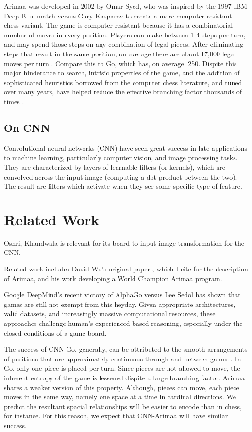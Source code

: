 \documentclass{article}
\begin{document}
Arimaa was developed in 2002 by Omar Syed, who was inspired by the 1997 IBM Deep Blue match versus Gary Kasparov to create a more computer-resistant chess variant.  The game is computer-resistant because it has a combinatorial number of moves in every position.  Players can make between 1-4 steps per turn, and may spend those steps on any combination of legal pieces.  After eliminating steps that result in the same position, on average there are about 17,000 legal moves per turn \cite{haskin}.  Compare this to Go, which has, on average, 250.  Dispite this major hinderance to search, intrisic properties of the game, and the addition of sophisticated heuristics borrowed from the computer chess literature, and tuned over many years, have helped reduce the effective branching factor thousands of times \cite{wu}.

\subsection{On CNN}

Convolutional neural networks (CNN) have seen great success in late applications to machine learning, particularly computer vision, and image processing tasks.  They are characterized by layers of learnable filters (or kernels), which are convolved across the input image (computing a dot product between the two).  The result are filters which activate when they see some specific type of feature.  

\section{Related Work}

Oshri, Khandwala \cite{Oshri_Khandwala} is relevant for its board to input image transformation for the CNN.

Related work includes David Wu's original paper \cite{wu}, which I cite for the description of Arimaa, and his work developing a World Champion Arimaa program.

Google DeepMind's recent victory of AlphaGo versus Lee Sedol has shown that games are still not exempt from this heyday.  Given appropriate architectures, valid datasets, and increasingly massive computational resources, these approaches challenge human's experienced-based reasoning, especially under the closed conditions of a game board.

The success of CNN-Go, generally, can be attributed to the smooth arrangements of positions that are approximately continuous through and between games \cite{Oshri_Khandwala}.  In Go, only one piece is placed per turn.  Since pieces are not allowed to move, the inherent entropy of the game is lessened dispite a large branching factor.  Arimaa shares a weaker version of this property.  Although, pieces can move, each piece moves in the same way, namely one space at a time in cardinal directions.  We predict the resultant spacial relationships will be easier to encode than in chess, for instance.  For this reason, we expect that CNN-Arimaa will have similar success.
\end{document}
